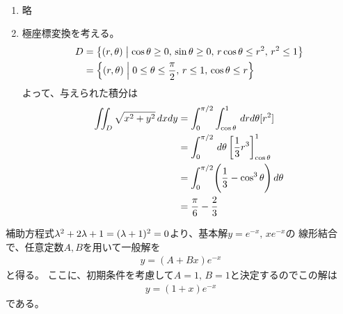 \begin{ans*}
  ${}$
  \begin{enumerate}[label=(\arabic*)]
    \item 略 %
    \item 極座標変換を考える。
    \begin{align}
      D
      &= \left\{(r,{\theta})\mathrel{}\middle| \mathrel{} \cos{\theta}\geq 0,\, \sin{\theta}\geq 0,\, r\cos{\theta}\leq r^2,\, r^2\leq 1\right\} \\
      &= \left\{(r,{\theta})\mathrel{}\middle| \mathrel{} 0\leq {\theta}\leq \frac{\pi}{2},\, r\leq 1,\, \cos{\theta} \leq r\right\}
    \end{align}
    よって、与えられた積分は
    \begin{align}
      \iint_D \sqrt{x^2+y^2}\,dxdy
      &= \int_{0}^{\pi/2}\int_{\cos{\theta}}^{1}\, drd{\theta} [r^2] \\
      &= \int_{0}^{\pi/2}\,d{\theta} \left[ \frac{1}{3}r^3 \right]_{\cos{\theta}}^{1} \\
      &= \int_{0}^{\pi/2} \Biggl( \frac{1}{3} - \cos^3{\theta} \Biggr)\, d{\theta} \\
      &= \frac{\pi}{6} - \frac{2}{3}
    \end{align}
  \end{enumerate}
\end{ans*}


\begin{ans*}
  補助方程式${\lambda}^2+2{\lambda}+1 = ({\lambda} + 1)^2 = 0$より、基本解$y = e^{-x},\,xe^{-x}$の
  線形結合で、任意定数$A,B$を用いて一般解を
  \begin{gather}
    y = (A+Bx)e^{-x}
  \end{gather}
  と得る。
  ここに、初期条件を考慮して$A = 1,\,B = 1$と決定するのでこの解は
  \begin{gather}
    y = (1+x)e^{-x}
  \end{gather}
  である。
\end{ans*}


